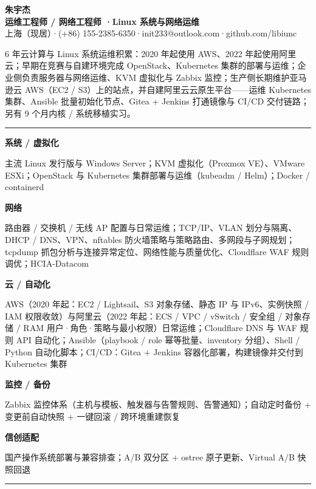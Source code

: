 \documentclass[10.5pt,a4paper]{article}
\newcommand{\cvsection}[1]{%
  \vspace{7pt}%
  \needspace{3\baselineskip}%
  \noindent
  \sbox{\sectbox}{\color{accent}\bfseries\fontsize{14.5}{16}\selectfont #1}%
  \usebox{\sectbox}\hspace{5pt}%
  \textcolor{accent}{\rule[4.4pt]{\dimexpr\linewidth-\wd\sectbox-5pt\relax}{0.9pt}}%
  \par\vspace{2.5pt}%
}
\newcommand{\skillrow}[2]{%
  \noindent
  \begin{minipage}[t]{2.45cm}\bfseries\small #1\end{minipage}%
  \begin{minipage}[t]{\dimexpr\linewidth-2.45cm\relax}\small #2\end{minipage}%
  \par\vspace{1pt}%
}
\begin{document}
\begin{center}
  {\bfseries\fontsize{25}{28}\selectfont 朱宇杰}\\[3pt]
  {\color{accent}\bfseries\fontsize{11}{13}\selectfont 运维工程师 / 网络工程师 \quad·\quad Linux 系统与网络运维}\\[4pt]
  {\color{muted}\small 上海（现居）\quad·\quad (+86) 155-2385-6350\quad·\quad init233@outlook.com\quad·\quad github.com/libiunc}
\end{center}
\vspace{-1pt}

{\small 6 年云计算与 Linux 系统运维积累：2020 年起使用 AWS、2022 年起使用阿里云；早期在竞赛与自建环境完成 OpenStack、Kubernetes 集群的部署与运维；企业侧负责服务器与网络运维、KVM 虚拟化与 Zabbix 监控；生产侧长期维护亚马逊云 AWS（EC2 / S3）上的站点，并自建阿里云云原生平台——运维 Kubernetes 集群、Ansible 批量初始化节点、Gitea + Jenkins 打通镜像与 CI/CD 交付链路；另有 9 个月内核 / 系统移植实习。\par}

\cvsection{核心能力}
\skillrow{系统 / 虚拟化}{主流 Linux 发行版与 Windows Server；KVM 虚拟化（Proxmox VE）、VMware ESXi；OpenStack 与 Kubernetes 集群部署与运维（kubeadm / Helm）；Docker / containerd}
\skillrow{网络}{路由器 / 交换机 / 无线 AP 配置与日常运维；TCP/IP、VLAN 划分与隔离、DHCP / DNS、VPN、nftables 防火墙策略与策略路由、多网段与子网规划；tcpdump 抓包分析与连接异常定位、网络性能与质量优化、Cloudflare WAF 规则调优；HCIA-Datacom}
\skillrow{云 / 自动化}{AWS（2020 年起：EC2 / Lightsail、S3 对象存储、静态 IP 与 IPv6、实例快照 / IAM 权限收敛）与阿里云（2022 年起：ECS / VPC / vSwitch / 安全组 / 对象存储 / RAM 用户·角色·策略与最小权限）日常运维；Cloudflare DNS 与 WAF 规则 API 自动化；Ansible（playbook / role 幂等批量、inventory 分组）、Shell / Python 自动化脚本；CI/CD：Gitea + Jenkins 容器化部署，构建镜像并交付到 Kubernetes 集群}
\skillrow{监控 / 备份}{Zabbix 监控体系（主机与模板、触发器与告警规则、告警通知）；自动定时备份 + 变更前自动快照 + 一键回滚 / 跨环境重建恢复}
\skillrow{信创适配}{国产操作系统部署与兼容排查；A/B 双分区 + ostree 原子更新、Virtual A/B 快照回退}

\cvsection{工作经历}
\end{document}
